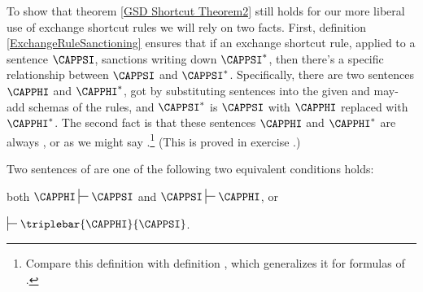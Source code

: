 To show that theorem \ref{GSD Shortcut Theorem2} still holds for our more liberal use of exchange shortcut rules we will rely on two facts. 
First, definition \ref{ExchangeRuleSanctioning} ensures that if an exchange shortcut rule, applied to a sentence $\CAPPSI$, sanctions writing down $\CAPPSI^*$, then there's a specific relationship between $\CAPPSI$ and $\CAPPSI^*$. 
Specifically, there are two sentences $\CAPPHI$ and $\CAPPHI^*$, got by substituting sentences into the given and may-add schemas of the rules, and $\CAPPSI^*$ is $\CAPPSI$ with $\CAPPHI$ replaced with $\CAPPHI^*$. 
The second fact is that these sentences $\CAPPHI$ and $\CAPPHI^*$ are always , or as we might say .\footnote{Compare 
this definition with definition , which generalizes it for formulas of \GQL{}.} 
(This is proved in exercise .)
\begin{majorILnc}{}
Two sentences of \GSL{} are  \Iff one of the following two equivalent conditions holds:
\begin{cenumerate}
\item both $\CAPPHI\sststile{}{}\CAPPSI$ and $\CAPPSI\sststile{}{}\CAPPHI$, or
\item $\sststile{}{}\triplebar{\CAPPHI}{\CAPPSI}$.
\end{cenumerate}
\end{majorILnc}

